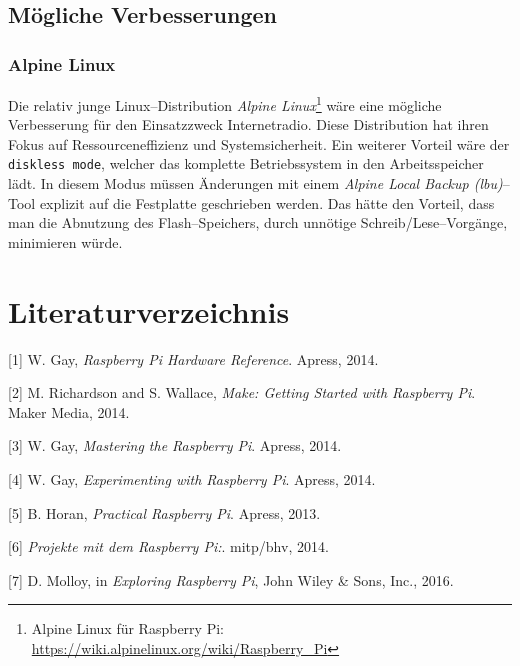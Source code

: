 \documentclass[11pt,ngerman,toc=listof,index=totoc]{scrreprt}
\begin{document}
\section{Mögliche Verbesserungen}\label{muxf6gliche-verbesserungen}

\subsection{Alpine Linux}\label{alpine-linux}

Die relativ junge Linux--Distribution \emph{Alpine Linux}\footnote{Alpine
  Linux für Raspberry Pi:
  \url{https://wiki.alpinelinux.org/wiki/Raspberry_Pi}} wäre eine
mögliche Verbesserung für den Einsatzzweck Internetradio. Diese
Distribution hat ihren Fokus auf Ressourceneffizienz und
Systemsicherheit. Ein weiterer Vorteil wäre der \texttt{diskless\ mode},
welcher das komplette Betriebssystem in den Arbeitsspeicher lädt. In
diesem Modus müssen Änderungen mit einem \emph{Alpine Local Backup
(lbu)}--Tool explizit auf die Festplatte geschrieben werden. Das hätte
den Vorteil, dass man die Abnutzung des Flash--Speichers, durch unnötige
Schreib/Lese--Vorgänge, minimieren würde.

\chapter*{Literaturverzeichnis}\label{literaturverzeichnis}

\hypertarget{refs}{}
\hypertarget{ref-gay2014raspberry}{}
{[}1{]} W. Gay, \emph{Raspberry Pi Hardware Reference}. Apress, 2014.

\hypertarget{ref-richardson2014make}{}
{[}2{]} M. Richardson and S. Wallace, \emph{Make: Getting Started with
Raspberry Pi}. Maker Media, 2014.

\hypertarget{ref-gay2014mastering}{}
{[}3{]} W. Gay, \emph{Mastering the Raspberry Pi}. Apress, 2014.

\hypertarget{ref-gay2014experimenting}{}
{[}4{]} W. Gay, \emph{Experimenting with Raspberry Pi}. Apress, 2014.

\hypertarget{ref-horan2013practical}{}
{[}5{]} B. Horan, \emph{Practical Raspberry Pi}. Apress, 2013.

\hypertarget{ref-2014projekte}{}
{[}6{]} \emph{Projekte mit dem Raspberry Pi:}. mitp/bhv, 2014.

\hypertarget{ref-exploring}{}
{[}7{]} D. Molloy, in \emph{Exploring Raspberry Pi}, John Wiley \& Sons,
Inc., 2016.
\end{document}
